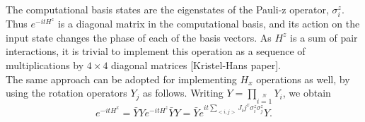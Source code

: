 \documentclass[../main.tex]{subfiles}
\begin{document}
The computational basis states are the eigenstates of the Pauli-z operator, $\sigma_i^z$. Thus $e^{-itH^z}$ is a diagonal matrix in the computational basis, and its action on the input state changes the phase of each of the basis vectors. As $H^z$ is a sum of pair interactions, it is trivial to implement this operation as a sequence of multiplications by $4 \times 4$ diagonal matrices [Kristel-Hans paper].\\

The same approach can be adopted for implementing $H_x$ operations as well, by using the rotation operators $Y_j$ as follows. Writing $Y=\prod \limits_{i=1} \limits^{N} Y_i$, we obtain
\begin{equation}
e^{-itH^x}=\bar{Y}Y e^{-itH^z}\bar{Y}Y=\bar{Y}e^{it \sum \limits_{<i,j>} J_ij^x \sigma_i^z \sigma_j^z} Y.
\end{equation}
\end{document}
